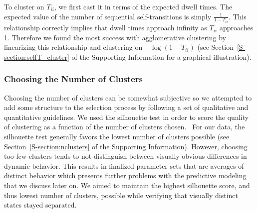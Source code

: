 \documentclass[journal=jpcbfk,manuscript=article]{achemso}
\begin{document}
  To cluster on $T_{ii}$, we first cast it in terms of the expected dwell times. The expected
  value of the number of sequential self-transitions is simply $\frac{1}{1 - T_{ii}}$. This 
  relationship correctly implies that dwell times approach infinity as $T_{ii}$ approaches
  1. Therefore we found the most success with agglomerative clustering by linearizing this
  relationship and clustering on $-\log(1 - T_{ii})$ (see Section~\ref{S-section:selfT_cluster}
  of the Supporting Information for a graphical illustration).
  
%   
 
  \subsubsection*{Choosing the Number of Clusters}

  Choosing the number of clusters can be somewhat subjective so
  we attempted to add some structure to the selection process by following
  a set of qualitative and quantitative guidelines. We used the silhouette 
  test in order to score the quality of clustering as a function of the number 
  of clusters chosen.~\cite{kaufman_finding_2009} For our data, the silhouette 
  test generally favors the lowest number of clusters possible (see 
  Section~\ref{S-section:nclusters} of the Supporting Information). However, 
  choosing too few clusters tends to not distinguish between visually obvious 
  differences in dynamic behavior. This results in finalized parameter sets 
  that are averages of distinct behavior which presents further problems with 
  the predictive modeling that we discuss later on. We aimed to maintain the 
  highest silhouette score, and thus lowest number of clusters, possible while
  verifying that visually distinct states stayed separated. 
\end{document}
